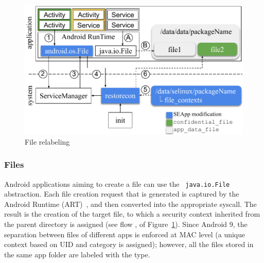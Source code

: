 \begin{figure}[t]
  \begin{center}
    \includegraphics[width=0.8\columnwidth]{chapters/seapp/figs/restorecon_service}
  \end{center}
  \caption{\label{fig:seapp_restorecon} File relabeling}
\end{figure}


\subsubsection{Files}\label{sect:seapp_impl_files}

Android applications aiming to create a file can use the {\tt
  java.io.File} abstraction.  Each file creation request that is
generated is captured by the Android Runtime
(ART)~\cite{seapp_androruntime}, and then converted into the
appropriate syscall.  The result is the creation of the target file,
to which a security context inherited from the parent directory is
assigned (see flow ,  of
Figure~\ref{fig:seapp_restorecon}).  Since Android 9, the separation
between files of different apps is enforced at MAC level (a unique
context based on UID and \sel category is assigned); however, all the
files stored in the same app folder are labeled with the \appdatafile
type.

